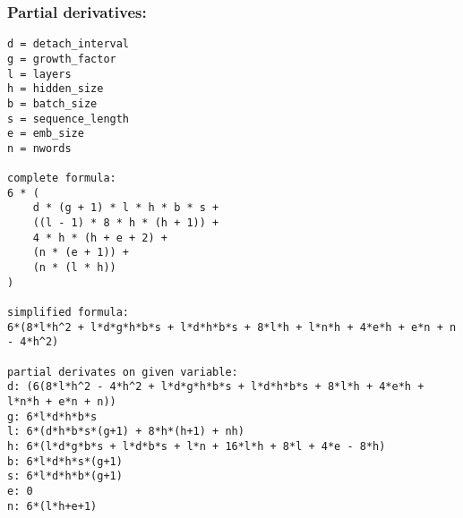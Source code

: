 \subsubsection{Partial derivatives:}

\begin{lstlisting}
d = detach_interval
g = growth_factor
l = layers
h = hidden_size
b = batch_size
s = sequence_length
e = emb_size
n = nwords

complete formula:
6 * (
	d * (g + 1) * l * h * b * s +
	((l - 1) * 8 * h * (h + 1)) +
	4 * h * (h + e + 2) +
	(n * (e + 1)) +
	(n * (l * h))
)

simplified formula:
6*(8*l*h^2 + l*d*g*h*b*s + l*d*h*b*s + 8*l*h + l*n*h + 4*e*h + e*n + n - 4*h^2)

partial derivates on given variable:
d: (6(8*l*h^2 - 4*h^2 + l*d*g*h*b*s + l*d*h*b*s + 8*l*h + 4*e*h + l*n*h + e*n + n))
g: 6*l*d*h*b*s
l: 6*(d*h*b*s*(g+1) + 8*h*(h+1) + nh)
h: 6*(l*d*g*b*s + l*d*b*s + l*n + 16*l*h + 8*l + 4*e - 8*h)
b: 6*l*d*h*s*(g+1)
s: 6*l*d*h*b*(g+1)
e: 0
n: 6*(l*h+e+1)
\end{lstlisting}

